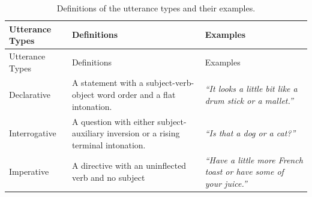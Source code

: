 \documentclass[floatsintext,man]{apa6}
\theoremstyle{definition}
\theoremstyle{definition}
\theoremstyle{definition}
\theoremstyle{remark}
\begin{document}
\begin{longtable}[]{@{}lll@{}}
\caption{\label{tab:utteranceTypes} Definitions of the utterance types and
their examples.}\tabularnewline
\toprule
\begin{minipage}[b]{0.18\columnwidth}\raggedright\strut
Utterance Types\strut
\end{minipage} & \begin{minipage}[b]{0.42\columnwidth}\raggedright\strut
Definitions\strut
\end{minipage} & \begin{minipage}[b]{0.32\columnwidth}\raggedright\strut
Examples\strut
\end{minipage}\tabularnewline
\midrule
\endfirsthead
\toprule
\begin{minipage}[b]{0.18\columnwidth}\raggedright\strut
Utterance Types\strut
\end{minipage} & \begin{minipage}[b]{0.42\columnwidth}\raggedright\strut
Definitions\strut
\end{minipage} & \begin{minipage}[b]{0.32\columnwidth}\raggedright\strut
Examples\strut
\end{minipage}\tabularnewline
\midrule
\endhead
\begin{minipage}[t]{0.18\columnwidth}\raggedright\strut
Declarative\strut
\end{minipage} & \begin{minipage}[t]{0.42\columnwidth}\raggedright\strut
A statement with a subject-verb-object word order and a flat
intonation.\strut
\end{minipage} & \begin{minipage}[t]{0.32\columnwidth}\raggedright\strut
\emph{\enquote{It looks a little bit like a drum stick or a
mallet.}}\strut
\end{minipage}\tabularnewline
\begin{minipage}[t]{0.18\columnwidth}\raggedright\strut
Interrogative\strut
\end{minipage} & \begin{minipage}[t]{0.42\columnwidth}\raggedright\strut
A question with either subject-auxiliary inversion or a rising terminal
intonation.\strut
\end{minipage} & \begin{minipage}[t]{0.32\columnwidth}\raggedright\strut
\emph{\enquote{Is that a dog or a cat?}}\strut
\end{minipage}\tabularnewline
\begin{minipage}[t]{0.18\columnwidth}\raggedright\strut
Imperative\strut
\end{minipage} & \begin{minipage}[t]{0.42\columnwidth}\raggedright\strut
A directive with an uninflected verb and no subject\strut
\end{minipage} & \begin{minipage}[t]{0.32\columnwidth}\raggedright\strut
\emph{\enquote{Have a little more French toast or have some of your
juice.}}\strut
\end{minipage}\tabularnewline
\bottomrule
\end{longtable}
\end{document}
